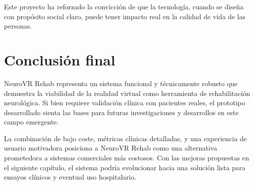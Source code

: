 Este proyecto ha reforzado la convicción de que la tecnología, cuando se diseña con propósito social claro, puede tener impacto real en la calidad de vida de las personas.

\section{Conclusión final}

NeuroVR Rehab representa un sistema funcional y técnicamente robusto que demuestra la viabilidad de la realidad virtual como herramienta de rehabilitación neurológica. Si bien requiere validación clínica con pacientes reales, el prototipo desarrollado sienta las bases para futuras investigaciones y desarrollos en este campo emergente.

La combinación de bajo coste, métricas clínicas detalladas, y una experiencia de usuario motivadora posiciona a NeuroVR Rehab como una alternativa prometedora a sistemas comerciales más costosos. Con las mejoras propuestas en el siguiente capítulo, el sistema podría evolucionar hacia una solución lista para ensayos clínicos y eventual uso hospitalario.
